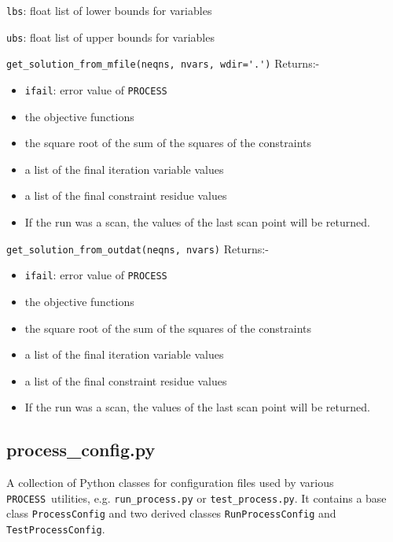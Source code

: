 \documentclass[11pt,a4paper]{article}
\newcommand{\process}{\mbox{\texttt{PROCESS}}}
\begin{document}
\begin{description}
  \texttt{lbs}: float list of lower bounds for variables

  \texttt{ubs}: float list of upper bounds for variables

\item{\verb|get_solution_from_mfile(neqns, nvars, wdir='.')|} Returns:-

\begin{itemize}
\item \texttt{ifail}: error value of \process
\item the objective functions
\item the square root of the sum of the squares of the constraints
\item a list of the final iteration variable values
\item a list of the final constraint residue values
\item If the run was a scan, the values of the last scan point will be returned.
\end{itemize}

\item{\verb|get_solution_from_outdat(neqns, nvars)|} Returns:-

\begin{itemize}
\item \texttt{ifail}: error value of \process
\item the objective functions
\item the square root of the sum of the squares of the constraints
\item a list of the final iteration variable values
\item a list of the final constraint residue values
\item If the run was a scan, the values of the last scan point will be returned.
\end{itemize}

\end{description}

\subsection{process\_config.py}

A collection of Python classes for configuration files used by various
\process\ utilities, e.g. \texttt{run\_process.py} or
\texttt{test\_process.py}. It contains a base class \texttt{ProcessConfig} and
two derived classes \texttt{RunProcessConfig} and \texttt{TestProcessConfig}.
\end{document}
